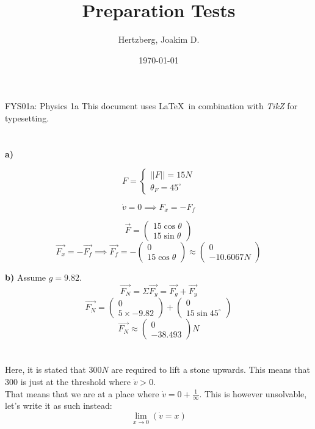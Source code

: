 \documentclass[12pt]{article}
\title{Preparation Tests}
\author{Hertzberg, Joakim D.}
\date{\today}
\begin{document}
\maketitle
\begin{center}
FYS01a: Physics 1a
\vfill
This document uses \LaTeX\ in combination with \emph{TikZ} for typesetting.
\end{center}
\newpage
\tableofcontents
\newpage
\section{ }
\textbf{a)} \bigbreak

$$F = \left\{ \begin{array}{l}
		||F|| = 15 \unit{N} \\
		\theta_F=45^{\circ}
		\end{array} \right.$$

	$$\dot{v} = 0 \implies F_x = -F_f$$

	$$\vec{F} = \begin{pmatrix} 15\cos{\theta} \\ 15\sin{\theta} \end{pmatrix}$$
	$$\vec{F_x} = -\vec{F_f} \implies \vec{F_f} = 
	-\begin{pmatrix} 0 \\ 15\cos{\theta} \end{pmatrix} 
	\approx \begin{pmatrix} 0 \\ -10.6067N \end{pmatrix}$$

 
\textbf{b)} \bigbreak
Assume $g=9.82$. \bigbreak
$$\vec{F_N} = \Sigma \vec{F_y} = \vec{F_g} + \vec{F_y}$$
$$\vec{F_N} = \begin{pmatrix} 0 \\ 5 \times -9.82 \end{pmatrix} + \begin{pmatrix} 0 \\ 15\sin{45^{\circ}} \end{pmatrix}$$
$$\vec{F_N} \approx \begin{pmatrix} 0 \\ -38.493 \end{pmatrix}N$$

\section{ }
\newpage
\section{ }
Here, it is stated that $300N$ are required to lift a stone upwards. This means that $300$ is just at the threshold where $\dot{v} > 0$. \\
That means that we are at a place where $\dot{v} = 0 + \frac{1}{\infty}$. This is however unsolvable, let's write it as such instead: 
$$\lim_{x\rightarrow0} \left( \dot{v} = x \right)$$
\end{document}
